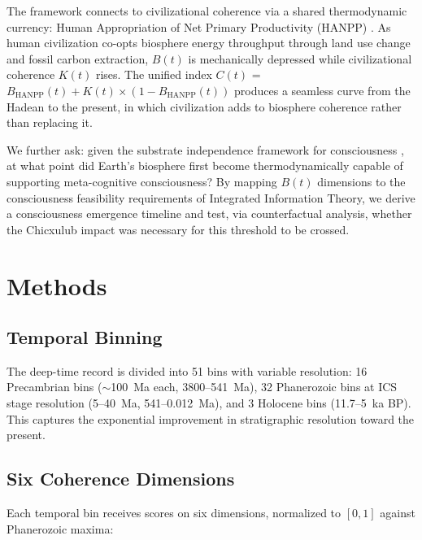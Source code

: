 \documentclass[10pt,letterpaper]{article}
\newcommand{\bt}{$B(t)$}
\newcommand{\kt}{$K(t)$}
\newcommand{\ct}{$C(t)$}
\begin{document}
The framework connects to civilizational coherence via a shared thermodynamic
currency: Human Appropriation of Net Primary Productivity (HANPP) \cite{haberl2007}.
As human civilization co-opts biosphere energy throughput through land use change
and fossil carbon extraction, \bt{} is mechanically depressed while civilizational
coherence \kt{} rises. The unified index \ct{} = $B_\text{HANPP}(t) + K(t) \times
(1 - B_\text{HANPP}(t))$ produces a seamless curve from the Hadean to the present,
in which civilization adds to biosphere coherence rather than replacing it.

We further ask: given the substrate independence framework for consciousness
\cite{putnam1967, tononi2004, chalmers2010}, at what point did Earth's biosphere
first become thermodynamically capable of supporting meta-cognitive consciousness?
By mapping \bt{} dimensions to the consciousness feasibility requirements of
Integrated Information Theory, we derive a consciousness emergence timeline and
test, via counterfactual analysis, whether the Chicxulub impact was necessary for
this threshold to be crossed.

\section*{Methods}

\subsection*{Temporal Binning}

The deep-time record is divided into 51 bins with variable resolution:
16 Precambrian bins ($\sim$100~Ma each, 3800--541~Ma), 32 Phanerozoic bins
at ICS stage resolution (5--40~Ma, 541--0.012~Ma), and 3 Holocene bins
(11.7--5~ka BP). This captures the exponential improvement in stratigraphic
resolution toward the present.

\subsection*{Six Coherence Dimensions}

Each temporal bin receives scores on six dimensions, normalized to $[0, 1]$
against Phanerozoic maxima:
\end{document}
